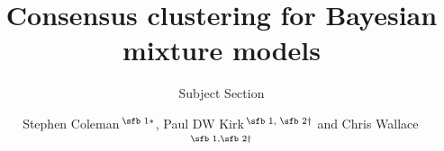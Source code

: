 \documentclass{bioinfo}
\begin{document}

\subtitle{Subject Section}

\title[Consensus clustering for Bayesian mixture models]{Consensus clustering for Bayesian mixture models}
\author[Sample \textit{et~al}.]{Stephen Coleman\,$^{\text{\sfb 1}*}$, Paul DW Kirk\,$^{\text{\sfb 1, \sfb 2}\dagger}$ and Chris Wallace\,$^{\text{\sfb 1,\sfb 2}\dagger}$}
\address{$^{\text{\sf 1}}$MRC Biostatistics Unit, University of Cambridge, Cambridge, CB2 0SR, United Kingdom and \\
$^{\text{\sf 2}}$Department of Medicine, University of Cambridge, Cambridge, CB2 0AW, United Kingdom.}



\end{document}
